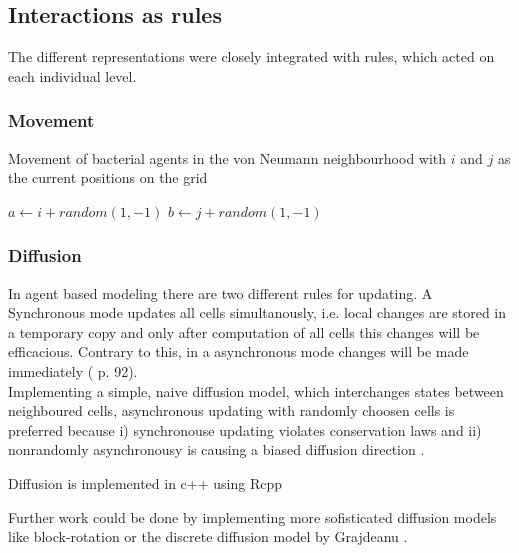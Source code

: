 \subsection{Interactions as rules}
The different representations were closely integrated with rules, which acted on each individual level.

\subsubsection{Movement}
\begin{algorithm}
\caption{Movement of bacterial agents in the von Neumann neighbourhood with $i$ and $j$ as the current positions on the grid}
\SetAlgoLined
$a \leftarrow i+random(1,-1)$\;
$b \leftarrow j+random(1,-1)$\;
\end{algorithm}

\subsubsection{Diffusion}
In agent based modeling there are two different rules for updating.
A Synchronous mode updates all cells simultanously, i.e. local changes are stored in a temporary copy and only after computation of all cells this changes will be efficacious.
Contrary to this, in a asynchronous mode changes will be made immediately (\cite{Matthies2002} p. 92).\\
Implementing a simple, naive diffusion model, which interchanges states between neighboured cells, asynchronous updating with randomly choosen cells is preferred because i) synchronouse updating violates conservation laws and ii) nonrandomly asynchronousy is causing a biased diffusion direction \cite{Bandman1999}.
\begin{algorithm}
  \caption{Diffusion is implemented in c++ using Rcpp}
  \SetAlgoLined
\end{algorithm}
Further work could be done by implementing more sofisticated diffusion models like block-rotation \cite{Bandman1999} or the discrete diffusion model by Grajdeanu \cite{Grajdeanu2007}.



